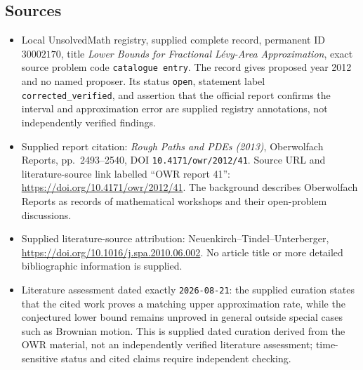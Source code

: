 \documentclass[11pt]{article}
\begin{document}
\subsection{Sources}
\begin{itemize}
\item Local UnsolvedMath registry, supplied complete record, permanent ID \(30002170\), title \emph{Lower Bounds for Fractional L\'evy-Area Approximation}, exact source problem code \texttt{catalogue entry}. The record gives proposed year 2012 and no named proposer. Its status \texttt{open}, statement label \texttt{corrected\_verified}, and assertion that the official report confirms the interval and approximation error are supplied registry annotations, not independently verified findings.
\item Supplied report citation: \emph{Rough Paths and PDEs (2013)}, Oberwolfach Reports, pp.\ 2493--2540, DOI \texttt{10.4171/owr/2012/41}. Source URL and literature-source link labelled ``OWR report 41'': \url{https://doi.org/10.4171/owr/2012/41}. The background describes Oberwolfach Reports as records of mathematical workshops and their open-problem discussions.
\item Supplied literature-source attribution: Neuenkirch--Tindel--Unterberger, \url{https://doi.org/10.1016/j.spa.2010.06.002}. No article title or more detailed bibliographic information is supplied.
\item Literature assessment dated exactly \texttt{2026-08-21}: the supplied curation states that the cited work proves a matching upper approximation rate, while the conjectured lower bound remains unproved in general outside special cases such as Brownian motion. This is supplied dated curation derived from the OWR material, not an independently verified literature assessment; time-sensitive status and cited claims require independent checking.
\end{itemize}
\end{document}
